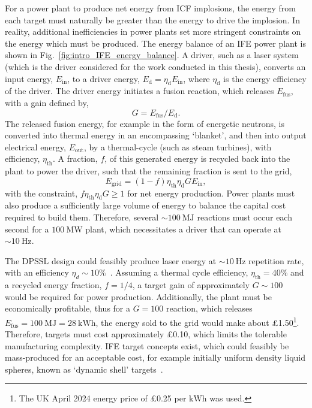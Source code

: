 For a power plant to produce net energy from \ac{ICF} implosions, the energy from each target must naturally be greater than the energy to drive the implosion.
In reality, additional inefficiencies in power plants set more stringent constraints on the energy which must be produced.
The energy balance of an \ac{IFE} power plant is shown in Fig.~\ref{fig:intro_IFE_energy_balance}.
A driver, such as a laser system (which is the driver considered for the work conducted in this thesis), converts an input energy, $E_{\text{in}}$, to a driver energy, $E_{\text{d}} = \eta_{\text{d}}E_{\text{in}}$, where $\eta_{\text{d}}$ is the energy efficiency of the driver.
The driver energy initiates a fusion reaction, which releases $E_{\text{fus}}$, with a gain defined by,
\begin{equation}
    G = E_{\text{fus}}/E_{\text{d}}.
\end{equation}
The released fusion energy, for example in the form of energetic neutrons, is converted into thermal energy in an encompassing `blanket', and then into output electrical energy, $E_\text{out}$, by a thermal-cycle (such as steam turbines), with efficiency, $\eta_{\text{th}}$.
A fraction, $f$, of this generated energy is recycled back into the plant to power the driver, such that the remaining fraction is sent to the grid,
\begin{equation}
    E_{\text{grid}} = (1-f) \eta_{\text{th}} \eta_{\text{d}} G E_{\text{in}},
\end{equation}
with the constraint, $f \eta_{\text{th}} \eta_{\text{d}} G \geq 1$ for net energy production.
Power plants must also produce a sufficiently large volume of energy to balance the capital cost required to build them.
Therefore, several $\sim100\ \text{MJ}$ reactions must occur each second for a $100\ \text{MW}$ plant, which necessitates a driver that can operate at $\sim10\ \text{Hz}$.

The \ac{DPSSL} design could feasibly produce laser energy at $\sim10\ \text{Hz}$ repetition rate, with an efficiency $\eta_d\sim10\%$~\cite{banerjee_dipole_2015,batani_future_2023}.
Assuming a thermal cycle efficiency, $\eta_{\text{th}}=40\%$ and a recycled energy fraction, $f=1/4$, a target gain of approximately $G\sim100$ would be required for power production.
Additionally, the plant must be economically profitable, thus for a $G=100$ reaction, which releases $E_{\text{fus}} = 100\ \text{MJ} = 28\ \text{kWh}$, the energy sold to the grid would make about £1.50\footnote{The UK April 2024 energy price of £0.25 per $\text{kWh}$ was used.}.
Therefore, targets must cost approximately £0.10, which limits the tolerable manufacturing complexity.
\ac{IFE} target concepts exist, which could feasibly be mass-produced for an acceptable cost, for example initially uniform density liquid spheres, known as `dynamic shell' targets~\cite{goncharov_novel_2020,igumenshchev_proofprinciple_2023}.


